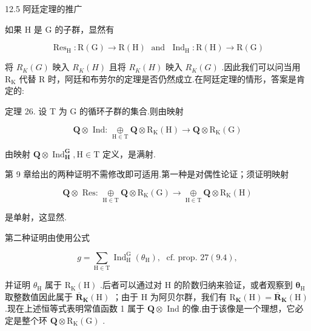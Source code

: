 \documentclass[10pt]{article}
\begin{document}
12.5 阿廷定理的推广

如果 \(\mathrm{H}\) 是 \(\mathrm{G}\) 的子群，显然有

\[
{\operatorname{Res}}_{\mathrm{H}} : \mathrm{R}\left( \mathrm{G}\right)  \rightarrow  \mathrm{R}\left( \mathrm{H}\right) \;\text{ and }\;{\operatorname{Ind}}_{\mathrm{H}} : \mathrm{R}\left( \mathrm{H}\right)  \rightarrow  \mathrm{R}\left( \mathrm{G}\right)
\]

将 \({R}_{K}\left( G\right)\) 映入 \({R}_{K}\left( H\right)\) 且将 \({R}_{K}\left( H\right)\) 映入 \({R}_{K}\left( G\right)\) .因此我们可以问当用 \({\mathrm{R}}_{\mathrm{K}}\) 代替 \(\mathrm{R}\) 时，阿廷和布劳尔的定理是否仍然成立.在阿廷定理的情形，答案是肯定的:

定理 26. 设 T 为 G 的循环子群的集合.则由映射

\[
\mathbf{Q} \otimes  \text{ Ind: }\underset{\mathrm{H} \in  \mathrm{T}}{ \oplus  }\mathbf{Q} \otimes  {\mathrm{R}}_{\mathrm{K}}\left( \mathrm{H}\right)  \rightarrow  \mathbf{Q} \otimes  {\mathrm{R}}_{\mathrm{K}}\left( \mathrm{G}\right)
\]

由映射 \(\mathbf{Q} \otimes  {\operatorname{Ind}}_{\mathbf{H}}^{\mathbf{G}},\mathrm{H} \in  \mathrm{T}\) 定义，是满射.

第 9 章给出的两种证明不需修改即可适用.第一种是对偶性论证；须证明映射

\[
\mathbf{Q} \otimes  \text{ Res: }\underset{\mathrm{H} \in  \mathrm{T}}{ \oplus  }\mathbf{Q} \otimes  {\mathrm{R}}_{\mathrm{K}}\left( \mathrm{G}\right)  \rightarrow  \underset{\mathrm{H} \in  \mathrm{T}}{ \oplus  }\mathbf{Q} \otimes  {\mathrm{R}}_{\mathrm{K}}\left( \mathrm{H}\right)
\]

是单射，这显然.

第二种证明由使用公式

\[
g = \mathop{\sum }\limits_{{\mathrm{H} \in  \mathrm{T}}}{\operatorname{Ind}}_{\mathrm{H}}^{\mathrm{G}}\left( {\theta }_{\mathrm{H}}\right) ,\;\text{ cf. prop. }{27}\left( {9.4}\right) ,
\]

并证明 \({\theta }_{\mathrm{H}}\) 属于 \({\mathrm{R}}_{\mathrm{K}}\left( \mathrm{H}\right)\) .后者可以通过对 \(\mathrm{H}\) 的阶数归纳来验证，或者观察到 \({\mathbf{\theta }}_{\mathrm{H}}\) 取整数值因此属于 \({\overline{\mathbf{R}}}_{\mathbf{K}}\left( \mathrm{H}\right)\) ；由于 \(\mathrm{H}\) 为阿贝尔群，我们有 \({\mathrm{R}}_{\mathbf{K}}\left( \mathrm{H}\right)  = {\overline{\mathbf{R}}}_{\mathbf{K}}\left( \mathrm{H}\right)\) .现在上述恒等式表明常值函数 1 属于 \(\mathbf{Q} \otimes\) Ind 的像.由于该像是一个理想，它必定是整个环 \(\mathbf{Q} \otimes  {\mathrm{R}}_{\mathrm{K}}\left( \mathrm{G}\right)\) .
\end{document}
